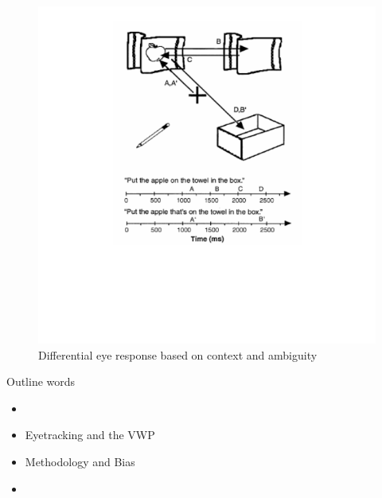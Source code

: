 \documentclass{beamer}
\begin{document}
\begin{frame}%
\begin{figure}
\centering
\includegraphics[width=\textwidth]{apple_combine_half.pdf}
\caption{Differential eye response based on context and ambiguity}
\end{figure}
\end{frame}


\begin{frame}{Outline}\Large
words 

\begin{itemize}
	\item 
	\item Eyetracking and the VWP
	\item Methodology and Bias
	\item
\end{itemize}

\end{frame}
\end{document}
